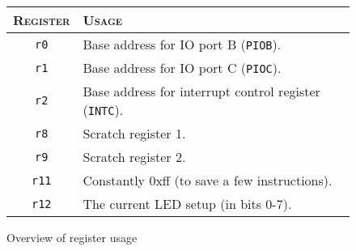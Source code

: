 \begin{figure}
\centering
\begin{tabular}{ c | l }
    \hline \hline
    \textsc{Register} & \textsc{Usage} \\ \hline
    \texttt{r0} &       Base address for IO port B (\texttt{PIOB}). \\
    \texttt{r1} &       Base address for IO port C (\texttt{PIOC}). \\
    \texttt{r2} &       Base address for interrupt control register
                        (\texttt{INTC}). \\
    \texttt{r8} &       Scratch register 1. \\
    \texttt{r9} &       Scratch register 2. \\
    \texttt{r11} &      Constantly 0xff (to save a few instructions). \\
    \texttt{r12} &      The current LED setup (in bits 0-7). \\
\end{tabular}
\caption{Overview of register usage}
\label{tab:Registers}
\end{figure}

